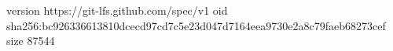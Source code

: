 version https://git-lfs.github.com/spec/v1
oid sha256:bc926336613810dcecd97cd7c5e23d047d7164eea9730e2a8c79faeb68273cef
size 87544
